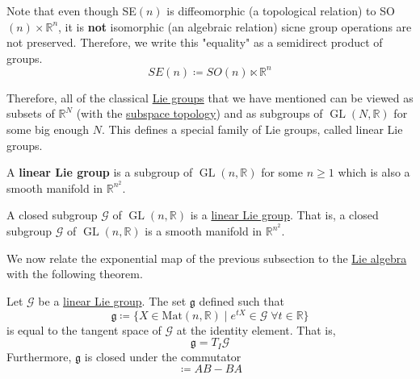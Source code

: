 \documentclass{article}
\DeclareMathOperator{\GL}{GL}
\newcounter{theorem}[section]
\newcounter{definition}[section]
\begin{document}
    Note that even though SE$(n)$ is diffeomorphic (a topological relation) to SO$(n) \times \mathbb{R}^n$, it is \textbf{not} isomorphic (an algebraic relation) sicne group operations are not preserved. Therefore, we write this "equality" as a semidirect product of groups. 
    \begin{equation}
      SE(n) \coloneqq SO(n) \ltimes \mathbb{R}^n
    \end{equation}

    Therefore, all of the classical \hyperref[def:lie-group]{Lie groups} that we have mentioned can be viewed as subsets of $\mathbb{R}^N$ (with the \hyperref[pst-def:subspace-topology]{subspace topology}) and as subgroups of $\GL(N, \mathbb{R})$ for some big enough $N$. This defines a special family of Lie groups, called linear Lie groups. 

    \begin{definition}
      \label{def:linear-lie-group}
      A \textbf{linear Lie group} is a subgroup of $\GL(n, \mathbb{R})$ for some $n \geq 1$ which is also a smooth manifold in $\mathbb{R}^{n^2}$. 
    \end{definition}

    \begin{theorem}
      \label{thm:von-neumann-cartan}
      A closed subgroup $\mathcal{G}$ of $\GL(n, \mathbb{R})$ is a \hyperref[def:linear-lie-group]{linear Lie group}. That is, a closed subgroup $\mathcal{G}$ of $\GL(n, \mathbb{R})$ is a smooth manifold in $\mathbb{R}^{n^2}$.
    \end{theorem}

    We now relate the exponential map of the previous subsection to the \hyperref[def:lie-algebra]{Lie algebra} with the following theorem. 

    \begin{theorem}
      \label{thm:lie-algebra-of-a-linear-lie-group}
      Let $\mathcal{G}$ be a \hyperref[def:linear-lie-group]{linear Lie group}. The set $\mathfrak{g}$ defined such that
      \begin{equation}
        \mathfrak{g} \coloneqq \{X \in \text{Mat}(n, \mathbb{R}) \; | \; e^{t X} \in \mathcal{G} \; \forall t \in \mathbb{R}\}
      \end{equation}
      is equal to the tangent space of $\mathcal{G}$ at the identity element. That is, 
      \begin{equation}
        \mathfrak{g} = T_I \mathcal{G}
      \end{equation}
      Furthermore, $\mathfrak{g}$ is closed under the commutator 
      \begin{equation}
        [A,B] \coloneqq A B - B A
      \end{equation}
    \end{theorem}
\end{document}
